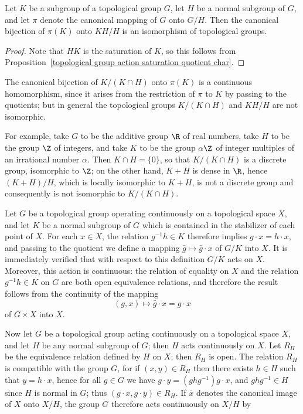 \begin{proposition}\label{topological group third isomorphism thm}
Let $K$ be a subgroup of a topological group $G$, let $H$ be a normal subgroup of $G$, and let $\pi$ denote the canonical mapping of $G$ onto $G/H$. Then the canonical bijection of $\pi(K)$ onto $KH/H$ is an isomorphism of topological groups.
\end{proposition}
\begin{proof}
Note that $HK$ is the saturation of $K$, so this follows from Proposition~\ref{topological group action saturation quotient char}.
\end{proof}
The canonical bijection of $K/(K\cap H)$ onto $\pi(K)$ is a continuous homomorphism, since it arises from the restriction of $\pi$ to $K$ by passing to the quotients; but in general the topological groups $K/(K\cap H)$ and $KH/H$ are not isomorphic.
\begin{example}
For example, take $G$ to be the additive group $\R$ of real numbers, take $H$ to be the group $\Z$ of integers, and take $K$ to be the group $\alpha\Z$ of integer multiples of an irrational number $\alpha$. Then $K\cap H=\{0\}$, so that $K/(K\cap H)$ is a discrete group, isomorphic to $\Z$; on the other hand, $K+H$ is dense in $\R$, hence $(K+H)/H$, which is locally isomorphic to $K+H$, is not a discrete group and consequently is not isomorphic to $K/(K\cap H)$.
\end{example}
Let $G$ be a topological group operating continuously on a topological space $X$, and let $K$ be a normal subgroup of $G$ which is contained in the stabilizer of each point of $X$. For each $x\in X$, the relation $g^{-1}h\in K$ therefore implies $g\cdot x=h\cdot x$, and passing to the quotient we define a mapping $\bar{g}\mapsto\bar{g}\cdot x$ of $G/K$ into $X$. It is immediately verified that with respect to this definition $G/K$ acts on $X$. Moreover, this action is continuous: the relation of equality on $X$ and the relation $g^{-1}h\in K$ on $G$ are both open equivalence relations, and therefore the result follows from the continuity of the mapping
\[(g,x)\mapsto\bar{g}\cdot x=g\cdot x\]
of $G\times X$ into $X$.\par
Now let $G$ be a topological group acting continuously on a topological space $X$, and let $H$ be any normal subgroup of $G$; then $H$ acts continuously on $X$. Let $R_H$ be the equivalence relation defined by $H$ on $X$; then $R_H$ is open. The relation $R_H$ is compatible with the group $G$, for if $(x,y)\in R_H$ then there exists $h\in H$ such that $y=h\cdot x$, hence for all $g\in G$ we have $g\cdot y=(ghg^{-1})g\cdot x$, and $ghg^{-1}\in H$ since $H$ is normal in $G$; thus $(g\cdot x,g\cdot y)\in R_H$. If $\bar{x}$ denotes the canonical image of $X$ onto $X/H$, the group $G$ therefore acts continuously on $X/H$ by
